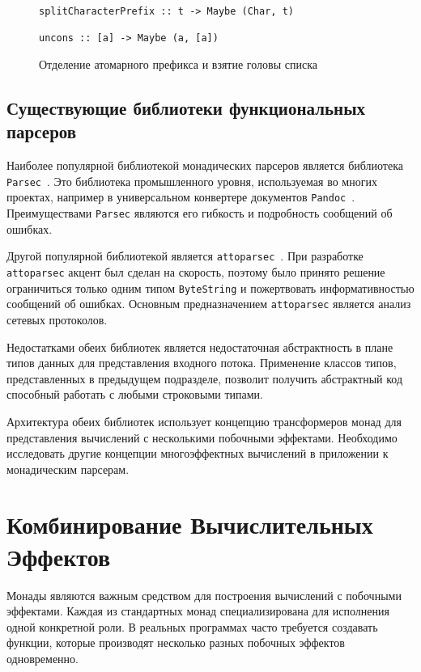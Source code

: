 \begin{figure}[h]
\begin{lstlisting}
splitCharacterPrefix :: t -> Maybe (Char, t)

uncons :: [a] -> Maybe (a, [a])
\end{lstlisting}
\caption{Отделение атомарного префикса и взятие головы списка}
\label{listing:Monoid}
\end{figure}

\section{Существующие библиотеки функциональных парсеров}

Наиболее популярной библиотекой монадических парсеров является библиотека 
\lstinline{Parsec}~\cite{parsec}. Это библиотека промышленного уровня, 
используемая во многих проектах, например в универсальном конвертере документов 
\lstinline{Pandoc}~\cite{pandoc}. Преимуществами \lstinline{Parsec} являются
 его гибкость и подробность сообщений об ошибках.

Другой популярной библиотекой является 
\lstinline{attoparsec}~\cite{attoparsec}. При разработке 
\lstinline{attoparsec} акцент был сделан на скорость, поэтому было принято 
решение ограничиться только одним типом \lstinline{ByteString} и пожертвовать 
информативностью сообщений об ошибках. Основным предназначением 
\lstinline{attoparsec} является анализ сетевых протоколов.

Недостатками обеих библиотек является недостаточная абстрактность в плане типов
данных для представления входного потока. Применение классов типов, 
представленных в предыдущем подразделе, позволит получить абстрактный код 
способный работать с любыми строковыми типами.

Архитектура обеих библиотек использует концепцию трансформеров монад для 
представления вычислений с несколькими побочными эффектами. Необходимо 
исследовать другие концепции многоэффектных вычислений в приложении к 
монадическим парсерам.

\chapter{Комбинирование Вычислительных Эффектов}

Монады являются важным средством для построения вычислений с побочными 
эффектами. Каждая из стандартных монад специализирована для исполнения
одной конкретной роли. В реальных программах часто требуется создавать функции,
которые производят несколько разных побочных эффектов одновременно.

